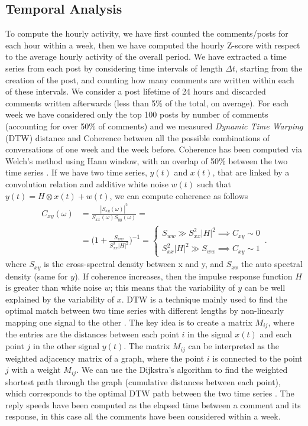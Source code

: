 \documentclass[fleqn,10pt]{wlscirep}
\begin{document}
\subsection*{Temporal Analysis}
%
To compute the hourly activity, we have first counted the comments/posts for each hour within a week, then we have computed the hourly Z-score with respect to the average hourly activity of the overall period.
%
We have extracted a time series from each post by considering time intervals of length $\Delta t$, starting from the creation of the post, and counting how many comments are written within each of these intervals. We consider a post lifetime of 24 hours and discarded comments written afterwards (less than 5\% of the total, on average). 
For each week we have considered only the top 100 posts by number of comments (accounting for over 50\% of comments) and we measured \emph{Dynamic Time Warping} (DTW) distance \cite{bellman1959adaptive} and Coherence between all the possible combinations of conversations of one week and the week before. 
Coherence has been computed via Welch's method \cite{welch_coherence} using Hann window, with an overlap of 50\% between the two time series \cite{virtanen2020scipy}. If we have two time series, $y(t)$ and $x(t)$, that are linked by a convolution relation and additive white noise $w(t)$ such that $y(t) = {H\otimes x}(t) + w(t)$, we can compute coherence as follows
\begin{align}
	C_{xy}(\omega) &= \frac{|S_{xy}(\omega)|^2}{S_{xx}(\omega)S_{yy}(\omega)}=\nonumber\\ 
    &=\biggl(1+\frac{S_{ww}}{S_{xx}^2|H|^2}\biggr)^{-1}=\begin{cases}S_{ww} \gg S_{xx}^2|H|^2 \implies C_{xy} \sim 0 \\
		S_{xx}^2|H|^2 \gg S_{ww} \implies C_{xy} \sim 1
	\end{cases}\,.
\end{align}
where $S_{xy}$ is the cross-spectral density between x and y, and $S_{xx}$ the auto spectral density (same for $y$).
If coherence increases, then the impulse response function $H$ is greater than white noise $w$; this means that the variability of $y$ can be well explained by the variability of $x$.
DTW is a technique mainly used to find the optimal match between two time series with different lengths by non-linearly mapping one signal to the other \cite{berndt1994using}.
The key idea is to create a matrix $M_{ij}$, where the entries are the distances between each point $i$ in the signal $x(t)$ and each point $j$ in the other signal $y(t)$. The matrix $M_{ij}$ can be interpreted as the weighted adjacency matrix of a graph, where the point $i$ is connected to the point $j$ with a weight $M_{ij}$. 
We can use the Dijkstra's algorithm to find the weighted shortest path through the graph (cumulative distances between each point), which corresponds to the optimal DTW path between the two time series \cite{berndt1994using}.
The reply speeds have been computed as the elapsed time between a comment and its response, in this case all the comments have been considered within a week.
%
\end{document}
